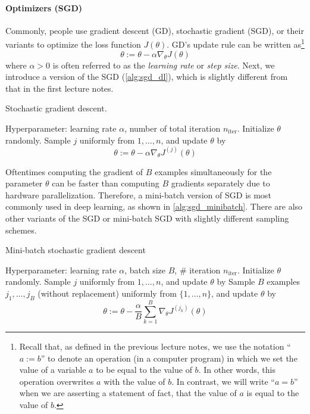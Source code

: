\paragraph{Optimizers (SGD)} Commonly, people use gradient descent (GD), stochastic
gradient (SGD), or their variants to optimize the loss function $J(\theta)$. GD's
update rule can be written as\footnote[][-2cm]{
Recall that, as defined in the previous lecture notes, we use the notation ``$a := b$'' to
denote an operation (in a computer program) in which we set the value of a variable $a$
to be equal to the value of $b$. In other words, this operation overwrites $a$ with the value
of $b$. In contrast, we will write ``$a = b$'' when we are asserting a statement of fact, that
the value of $a$ is equal to the value of $b$.}
\begin{equation}
    \theta := \theta - \alpha\nabla_\theta J(\theta)
\end{equation}
where $\alpha > 0$ is often referred to as the \textit{learning rate} or \textit{step size}. Next, we
introduce a version of the SGD (\cref{alg:sgd_dl}), which is slightly different from %
that in the first lecture notes.
\begin{algorithm}[ht]
    \caption{Stochastic gradient descent.}
    \label{alg:sgd_dl}
    \begin{algorithmic}
    \State Hyperparameter: learning rate $\alpha$, number of total iteration $n_\text{iter}$.
    \State Initialize $\theta$ randomly.
        \State Sample $j$ uniformly from ${1,\ldots,n}$, and update $\theta$ by
        \begin{equation*}
            \theta := \theta - \alpha\nabla_\theta J^{(j)}(\theta)
        \end{equation*}
    \EndFor
    \end{algorithmic}
\end{algorithm}
Oftentimes computing the gradient of $B$ examples simultaneously for the
parameter $\theta$ can be faster than computing $B$ gradients separately due to
hardware parallelization. Therefore, a mini-batch version of SGD is most
commonly used in deep learning, as shown in \cref{alg:sgd_minibatch}. There are also
other variants of the SGD or mini-batch SGD with slightly different sampling
schemes.

\begin{algorithm}[ht]
    \caption{Mini-batch stochastic gradient descent}
    \label{alg:sgd_minibatch}
    \begin{algorithmic}
    \State Hyperparameter: learning rate $\alpha$, batch size $B$, \# iteration $n_\text{iter}$.
    \State Initialize $\theta$ randomly.
        \State Sample $j$ uniformly from ${1,\ldots,n}$, and update $\theta$ by
        \State Sample $B$ examples $j_1,\ldots,j_B$ (without replacement) uniformly from $\{1,\ldots,n\}$, and update $\theta$ by
        \begin{equation*}
            \theta := \theta - \frac{\alpha}{B}\sum_{k=1}^B\nabla_\theta J^{(j_k)}(\theta)
        \end{equation*}
    \EndFor
    \end{algorithmic}
\end{algorithm}

